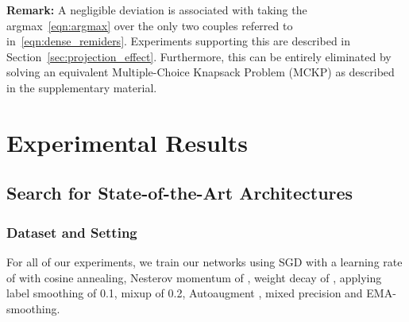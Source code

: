 \documentclass[dvipsnames,table,xcdraw]{article}
\begin{document}
\textbf{Remark:} A negligible deviation is associated with taking the argmax~\eqref{eqn:argmax} over the only two couples referred to in~\eqref{eqn:dense_remiders}. Experiments supporting this are described in Section~\ref{sec:projection_effect}. Furthermore, this can be entirely eliminated by solving an equivalent Multiple-Choice Knapsack Problem (MCKP) as described in the supplementary material.










































































 \section{Experimental Results}\label{sec:experiments}

\subsection{Search for State-of-the-Art Architectures}
\subsubsection{Dataset and Setting} \label{sec:exp_setting}
For all of our experiments, we train our networks using SGD with a learning rate of  with cosine annealing, Nesterov momentum of , weight decay of , applying label smoothing \cite{label_smoothing} of 0.1, mixup \cite{mixup} of 0.2, Autoaugment \cite{autoaugment}, mixed precision and EMA-smoothing.
\end{document}

